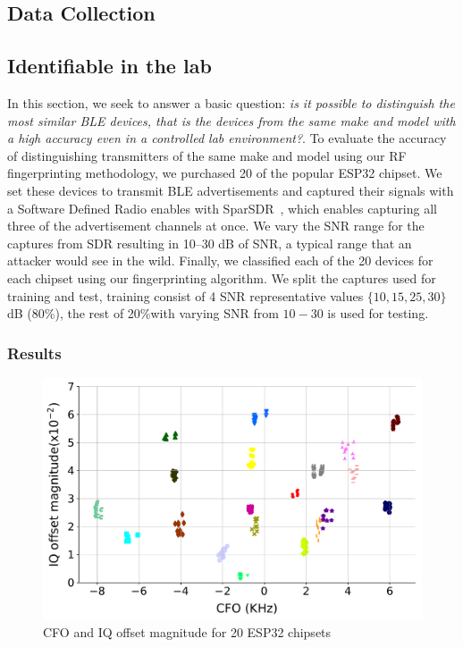\subsection{Data Collection}

\subsection{Identifiable in the lab}
\label{sec:results:lab}

In this section, we seek to answer a basic question: \textit{is it possible to distinguish the most similar BLE devices, that is the devices from the same make and model with a high accuracy even in a controlled lab environment?}. To evaluate the accuracy of distinguishing
transmitters of the same make and model using our RF fingerprinting methodology, we purchased 20 of the popular ESP32 chipset. We set these
devices to transmit BLE advertisements and captured their signals with a Software Defined Radio enables with SparSDR~\cite{sparsdr}, which enables capturing all three of the advertisement channels at once. We vary the SNR range for the captures from SDR resulting in 10--30 dB of SNR, a typical range that an attacker would see in the wild. Finally, we classified each of the 20 devices for each chipset using our fingerprinting algorithm. We split the captures used for training and test, training consist of 4 SNR representative values $\{10,15,25,30\}$ dB (80\%), the rest of 20\%with varying SNR from $10-30$  is used for testing. 

\subsubsection*{Results}

\begin{figure}[t!]
    \centering
    \includegraphics[width = \linewidth]{plots/ESP_CFOIQ.pdf} 
    \caption{CFO and IQ offset magnitude for 20 ESP32 chipsets}
    \label{fig:esp}
\end{figure}

